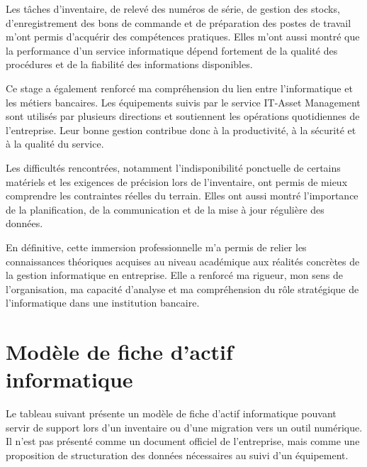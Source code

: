 \documentclass[12pt,a4paper]{report}
\begin{document}
Les tâches d'inventaire, de relevé des numéros de série, de gestion des stocks, d'enregistrement des bons de commande et de préparation des postes de travail m'ont permis d'acquérir des compétences pratiques. Elles m'ont aussi montré que la performance d'un service informatique dépend fortement de la qualité des procédures et de la fiabilité des informations disponibles.

Ce stage a également renforcé ma compréhension du lien entre l'informatique et les métiers bancaires. Les équipements suivis par le service IT-Asset Management sont utilisés par plusieurs directions et soutiennent les opérations quotidiennes de l'entreprise. Leur bonne gestion contribue donc à la productivité, à la sécurité et à la qualité du service.

Les difficultés rencontrées, notamment l'indisponibilité ponctuelle de certains matériels et les exigences de précision lors de l'inventaire, ont permis de mieux comprendre les contraintes réelles du terrain. Elles ont aussi montré l'importance de la planification, de la communication et de la mise à jour régulière des données.

En définitive, cette immersion professionnelle m'a permis de relier les connaissances théoriques acquises au niveau académique aux réalités concrètes de la gestion informatique en entreprise. Elle a renforcé ma rigueur, mon sens de l'organisation, ma capacité d'analyse et ma compréhension du rôle stratégique de l'informatique dans une institution bancaire.

\appendix

\chapter{Modèle de fiche d'actif informatique}

Le tableau suivant présente un modèle de fiche d'actif informatique pouvant servir de support lors d'un inventaire ou d'une migration vers un outil numérique. Il n'est pas présenté comme un document officiel de l'entreprise, mais comme une proposition de structuration des données nécessaires au suivi d'un équipement.
\end{document}
